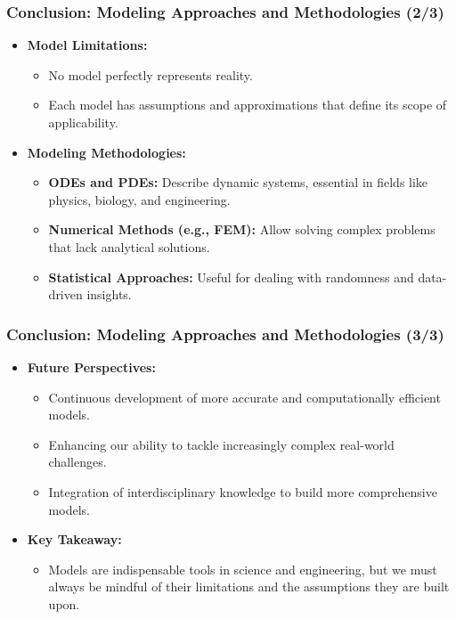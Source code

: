 \documentclass{beamer}
\begin{document}
\begin{frame}
\frametitle{Conclusion: Modeling Approaches and Methodologies (2/3)}
\begin{itemize}
    \item \textbf{Model Limitations:} 
    \begin{itemize}
        \item No model perfectly represents reality.
        \item Each model has assumptions and approximations that define its scope of applicability.
    \end{itemize}
    
    \item \textbf{Modeling Methodologies:}
    \begin{itemize}
        \item \textbf{ODEs and PDEs:} Describe dynamic systems, essential in fields like physics, biology, and engineering.
        \item \textbf{Numerical Methods (e.g., FEM):} Allow solving complex problems that lack analytical solutions.
        \item \textbf{Statistical Approaches:} Useful for dealing with randomness and data-driven insights.
    \end{itemize}
\end{itemize}
\end{frame}

\begin{frame}
\frametitle{Conclusion: Modeling Approaches and Methodologies (3/3)}
\begin{itemize}
    \item \textbf{Future Perspectives:} 
    \begin{itemize}
        \item Continuous development of more accurate and computationally efficient models.
        \item Enhancing our ability to tackle increasingly complex real-world challenges.
        \item Integration of interdisciplinary knowledge to build more comprehensive models.
    \end{itemize}
    
    \item \textbf{Key Takeaway:} 
    \begin{itemize}
        \item Models are indispensable tools in science and engineering, but we must always be mindful of their limitations and the assumptions they are built upon.
    \end{itemize}
\end{itemize}
\end{frame}
\end{document}
